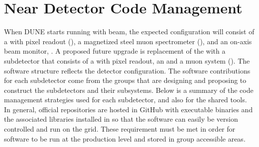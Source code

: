 \documentclass[../main-v1.tex]{subfiles}
\begin{document}


\section{Near Detector Code Management }
\label{sec:codemgmt:neardet}  %

When DUNE starts running with beam, the expected  configuration will consist of a  with pixel readout (), a magnetized steel muon spectrometer (), and an on-axis beam monitor, .  A proposed future upgrade is replacement of the  with a subdetector that consists of a  with pixel readout, an  and a muon system (). The software structure reflects the detector configuration.  The software %
contributions for each subdetector %
come from the groups that are designing and proposing to construct the subdetectors and their subsystems.  Below is a summary of the code management strategies used for each subdetector, %
and also for the shared tools. In general, official repositories are hosted in GitHub with executable binaries and the associated libraries installed in  so that the software can easily be version controlled and run on the grid. These requirement must be met in order for software to be run at the production level and stored in group accessible areas. 
\end{document}
